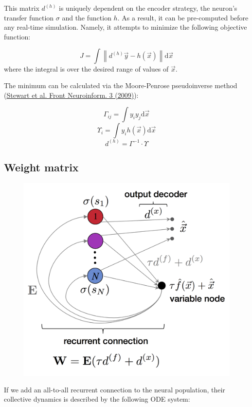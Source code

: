 \documentclass{report}
\makeatletter
\def\maxwidth{\ifdim\Gin@nat@width>\linewidth\linewidth
    \else\Gin@nat@width\fi}
\let\Oldincludegraphics\includegraphics
\renewcommand{\includegraphics}[1]{\Oldincludegraphics[width=.8\maxwidth]{#1}}
\makeatother
\begin{document}
This matrix \(d^{(h)}\) is uniquely dependent on the encoder strategy,
the neuron's transfer function \(\sigma\) and the function \(h\). As a
result, it can be pre-computed before any real-time simulation. Namely,
it attempts to minimize the following objective function:

\[J = \int \left\lVert d^{(h)}\vec y - h(\vec x)\right\rVert \mathrm{d}\vec x\]
where the integral is over the desired range of values of \(\vec x\).

The minimum can be calculated via the Moore-Penrose pseudoinverse method
(\href{https://doi.org/10.3389/neuro.11.007.2009}{Stewart et al. Front
Neuroinform. 3 (2009)}):

\[
\Gamma_{ij} = \int y_i y_j \mathrm{d}\vec x
\] \[
\Upsilon_i = \int y_i h(\vec x) \mathrm{d} \vec x
\] \[
d^{(h)} = \Gamma^{-1} \cdot \Upsilon
\]

\subsection{Weight matrix}\label{weight-matrix}

\begin{figure}
\centering
\includegraphics{Fig2.png}
\caption{}
\end{figure}

If we add an all-to-all recurrent connection to the neural population,
their collective dynamics is described by the following ODE system:
\end{document}
